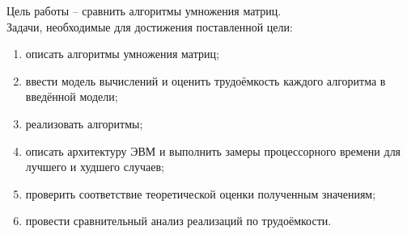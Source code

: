 
Цель работы -- сравнить алгоритмы умножения матриц.\\

Задачи, необходимые для достижения поставленной цели:
\begin{enumerate}
	\item описать алгоритмы умножения матриц;
	\item ввести модель вычислений и оценить трудоёмкость каждого алгоритма в введённой модели;
	\item реализовать алгоритмы;
	\item описать архитектуру ЭВМ и выполнить замеры процессорного времени для лучшего и худшего случаев;
	\item проверить соответствие теоретической оценки полученным значениям;
	\item провести сравнительный анализ реализаций по трудоёмкости.
\end{enumerate}

\clearpage

